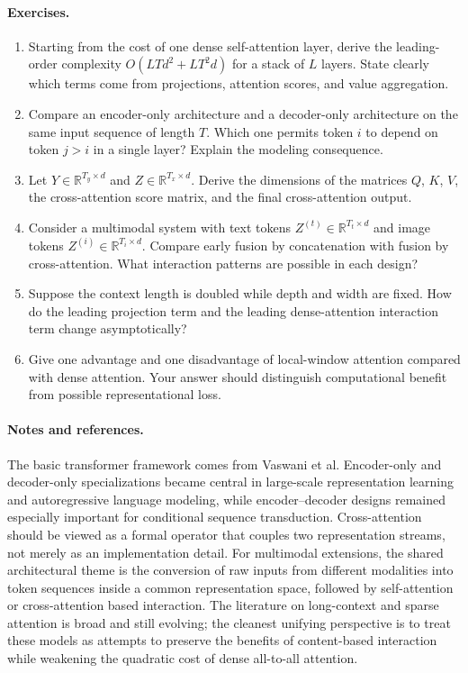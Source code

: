 \paragraph{Exercises.}
\begin{enumerate}
    \item Starting from the cost of one dense self-attention layer, derive the leading-order complexity \(O(LTd^2 + LT^2 d)\) for a stack of \(L\) layers.
    State clearly which terms come from projections, attention scores, and value aggregation.
    \item Compare an encoder-only architecture and a decoder-only architecture on the same input sequence of length \(T\).
    Which one permits token \(i\) to depend on token \(j>i\) in a single layer?
    Explain the modeling consequence.
    \item Let \(Y \in \mathbb{R}^{T_y \times d}\) and \(Z \in \mathbb{R}^{T_x \times d}\).
    Derive the dimensions of the matrices \(Q\), \(K\), \(V\), the cross-attention score matrix, and the final cross-attention output.
    \item Consider a multimodal system with text tokens \(Z^{(t)} \in \mathbb{R}^{T_t \times d}\) and image tokens \(Z^{(i)} \in \mathbb{R}^{T_i \times d}\).
    Compare early fusion by concatenation with fusion by cross-attention.
    What interaction patterns are possible in each design?
    \item Suppose the context length is doubled while depth and width are fixed.
    How do the leading projection term and the leading dense-attention interaction term change asymptotically?
    \item Give one advantage and one disadvantage of local-window attention compared with dense attention.
    Your answer should distinguish computational benefit from possible representational loss.
\end{enumerate}

\paragraph{Notes and references.}
The basic transformer framework comes from Vaswani et al.
Encoder-only and decoder-only specializations became central in large-scale representation learning and autoregressive language modeling, while encoder--decoder designs remained especially important for conditional sequence transduction.
Cross-attention should be viewed as a formal operator that couples two representation streams, not merely as an implementation detail.
For multimodal extensions, the shared architectural theme is the conversion of raw inputs from different modalities into token sequences inside a common representation space, followed by self-attention or cross-attention based interaction.
The literature on long-context and sparse attention is broad and still evolving; the cleanest unifying perspective is to treat these models as attempts to preserve the benefits of content-based interaction while weakening the quadratic cost of dense all-to-all attention.
